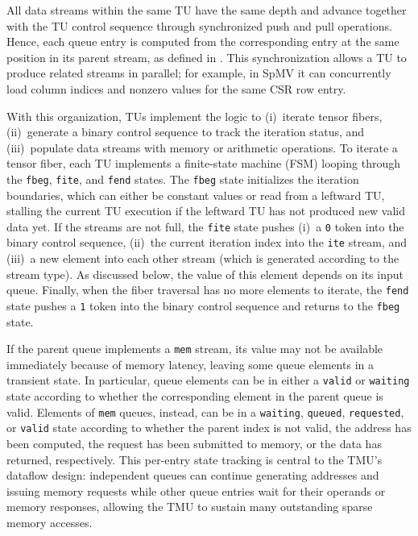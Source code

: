 All data streams within the same TU have the same depth and advance together with the TU control sequence through synchronized push and pull operations.
Hence, each queue entry is computed from the corresponding entry at the same position in its parent stream, as defined in .
This synchronization allows a TU to produce related streams in parallel; for example, in SpMV it can concurrently load column indices and nonzero values for the same CSR row entry.

With this organization, TUs implement the logic to (i)~iterate tensor fibers, (ii)~generate a binary control sequence to track the iteration status, and (iii)~populate data streams with memory or arithmetic operations.
To iterate a tensor fiber, each TU implements a finite-state machine (FSM) looping through the \texttt{fbeg}, \texttt{fite}, and \texttt{fend} states.
The \texttt{fbeg} state initializes the iteration boundaries, which can either be constant values or read from a leftward TU, stalling the current TU execution if the leftward TU has not produced new valid data yet.
If the streams are not full, the \texttt{fite} state pushes (i)~a \texttt{0} token into the binary control sequence, (ii)~the current iteration index into the \texttt{ite} stream, and (iii)~a new element into each other stream (which is generated according to the stream type).
As discussed below, the value of this element depends on its input queue.
Finally, when the fiber traversal has no more elements to iterate, the \texttt{fend} state pushes a \texttt{1} token into the binary control sequence and returns to the \texttt{fbeg} state.

If the parent queue implements a \texttt{mem} stream, its value may not be available immediately because of memory latency, leaving some queue elements in a transient state. In particular, queue elements can be in either a \texttt{valid} or \texttt{waiting} state according to whether the corresponding element in the parent queue is valid. Elements of \texttt{mem} queues, instead, can be in a \texttt{waiting}, \texttt{queued}, \texttt{requested}, or \texttt{valid} state according to whether the parent index is not valid, the address has been computed, the request has been submitted to memory, or the data has returned, respectively.
This per-entry state tracking is central to the TMU's dataflow design: independent queues can continue generating addresses and issuing memory requests while other queue entries wait for their operands or memory responses, allowing the TMU to sustain many outstanding sparse memory accesses.


